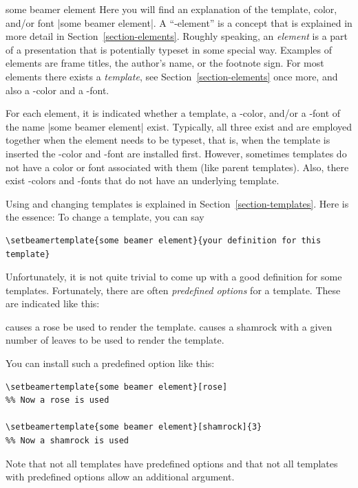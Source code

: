 \begin{element}{some beamer element}\yes\yes\yes
  Here you will find an explanation of the template, color, and/or font |some beamer element|. A ``\beamer-element'' is a concept that is explained in more detail in Section~\ref{section-elements}. Roughly speaking, an \emph{element} is a part of a presentation that is potentially typeset in some special way. Examples of elements are frame titles, the author's name, or the footnote sign. For most elements there exists a \emph{template}, see Section~\ref{section-elements} once more, and also a \beamer-color and a \beamer-font.

  For each element, it is indicated whether a template, a \beamer-color, and/or a \beamer-font of the name |some beamer element| exist. Typically, all three exist and are employed together when the element needs to be typeset, that is, when the template is inserted the \beamer-color and -font are installed first. However, sometimes templates do not have a color or font associated with them (like parent templates). Also, there exist \beamer-colors and -fonts that do not have an underlying template.

  Using and changing templates is explained in Section~\ref{section-templates}. Here is the essence: To change a template, you can say
\begin{verbatim}
\setbeamertemplate{some beamer element}{your definition for this template}
\end{verbatim}

  Unfortunately, it is not quite trivial to come up with a good definition for some templates. Fortunately, there are often \emph{predefined options} for a template. These are indicated like this:
  \begin{itemize}
    causes a rose be used to render the template.
    causes a shamrock with a given number of leaves to be used to render the template.
  \end{itemize}

  You can install such a predefined option like this:
\begin{verbatim}
\setbeamertemplate{some beamer element}[rose]
%% Now a rose is used

\setbeamertemplate{some beamer element}[shamrock]{3}
%% Now a shamrock is used
\end{verbatim}
  Note that not all templates have predefined options and that not all templates with predefined options allow an additional argument.


\end{element}
